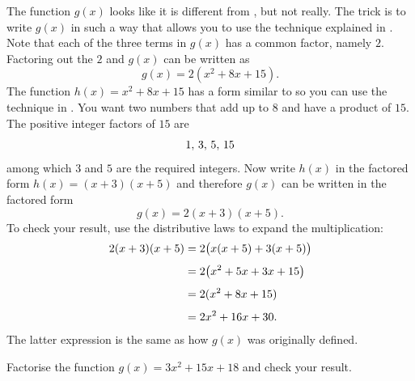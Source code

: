 \documentclass[a4paper,oneside,12pt]{article}
\begin{document}
\begin{solution}
The function $g(x)$ looks like it is different from
, but not really.  The trick
is to write $g(x)$ in such a way that allows you to use the technique
explained in .  Note that each of
the three terms in $g(x)$ has a common factor, namely $2$.  Factoring
out the $2$ and $g(x)$ can be written as
\[
g(x)
=
2 (x^2 + 8x + 15).
\]
The function $h(x) = x^2 + 8x + 15$ has a form similar to
 so you can use the technique
in .  You want two numbers that
add up to $8$ and have a product of $15$.  The positive integer
factors of $15$ are
\[
{1},\, {3},\, {5},\, {15}
\]
among which $3$ and $5$ are the required integers.  Now write $h(x)$
in the factored form $h(x) = (x + 3) (x + 5)$ and therefore $g(x)$ can
be written in the factored form
\[
g(x)
=
2 (x + 3) (x + 5).
\]
To check your result, use the distributive laws to expand the
multiplication:
\begin{align*}
2 (x + 3) (x + 5)
&=
2 \big(x(x + 5) + 3(x + 5)\big) \\[4pt]
&=
2 \big(x^2 + 5x + 3x + 15\big) \\[4pt]
&=
2 (x^2 + 8x + 15) \\[4pt]
&=
2x^2 + 16x + 30.
\end{align*}
The latter expression is the same as how $g(x)$ was originally
defined.
\end{solution}

\begin{exercise}
Factorise the function $g(x) = 3x^2 + 15x + 18$ and check your
result.
\end{exercise}

\end{document}
